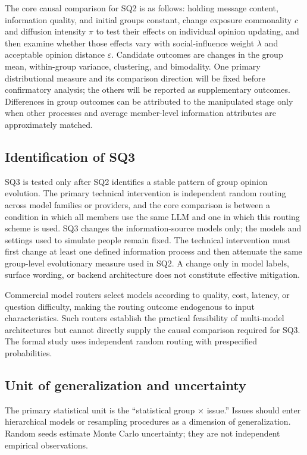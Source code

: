 \documentclass[11pt,a4paper]{article}
\begin{document}
The core causal comparison for SQ2 is as follows: holding message content, information quality, and initial groups constant, change exposure commonality $c$ and diffusion intensity $\pi$ to test their effects on individual opinion updating, and then examine whether those effects vary with social-influence weight $\lambda$ and acceptable opinion distance $\varepsilon$. Candidate outcomes are changes in the group mean, within-group variance, clustering, and bimodality. One primary distributional measure and its comparison direction will be fixed before confirmatory analysis; the others will be reported as supplementary outcomes. Differences in group outcomes can be attributed to the manipulated stage only when other processes and average member-level information attributes are approximately matched.

\subsection{Identification of SQ3}

SQ3 is tested only after SQ2 identifies a stable pattern of group opinion evolution. The primary technical intervention is independent random routing across model families or providers, and the core comparison is between a condition in which all members use the same LLM and one in which this routing scheme is used. SQ3 changes the information-source models only; the models and settings used to simulate people remain fixed. The technical intervention must first change at least one defined information process and then attenuate the same group-level evolutionary measure used in SQ2. A change only in model labels, surface wording, or backend architecture does not constitute effective mitigation.

Commercial model routers select models according to quality, cost, latency, or question difficulty, making the routing outcome endogenous to input characteristics. Such routers establish the practical feasibility of multi-model architectures but cannot directly supply the causal comparison required for SQ3. The formal study uses independent random routing with prespecified probabilities.

\subsection{Unit of generalization and uncertainty}

The primary statistical unit is the ``statistical group $\times$ issue.'' Issues should enter hierarchical models or resampling procedures as a dimension of generalization. Random seeds estimate Monte Carlo uncertainty; they are not independent empirical observations.
\end{document}
